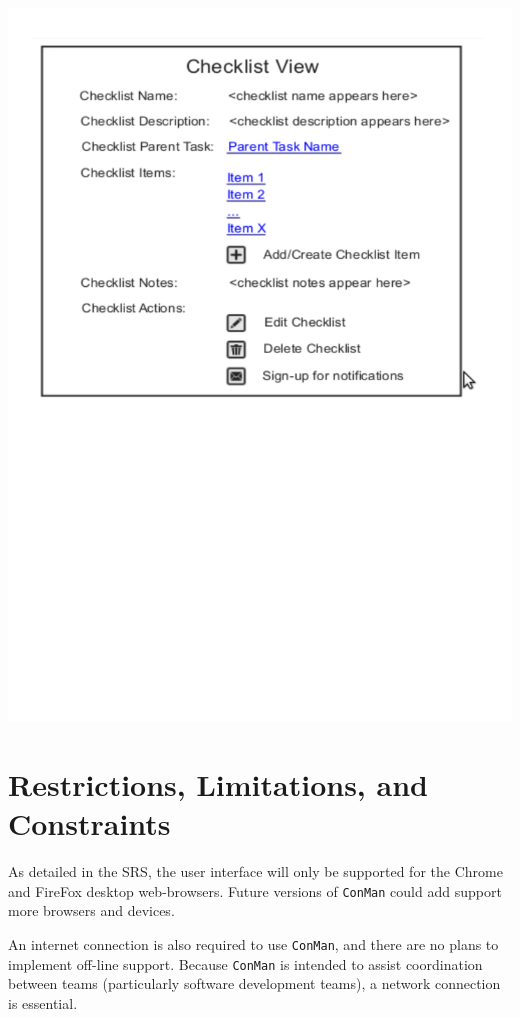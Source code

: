 \documentclass{article}
\begin{document}
\begin{center}
\includegraphics[trim = 0cm 5cm 0cm 0cm, clip=true, scale=0.7]{images/checklistview}
\end{center}
\newpage
\section{Restrictions, Limitations, and Constraints}
As detailed in the SRS, the user interface will only be supported for the Chrome and FireFox desktop web-browsers.
Future versions of \texttt{ConMan} could add support more browsers and devices.

An internet connection is also required to use \texttt{ConMan}, and there are no plans to implement off-line support.
Because \texttt{ConMan} is intended to assist coordination between teams (particularly software development teams), a network connection is essential.
\newpage
\end{document}

